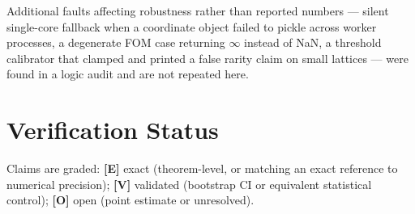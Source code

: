 \documentclass[11pt,a4paper]{article}
\begin{document}
Additional faults affecting robustness rather than reported numbers --- silent single-core
fallback when a coordinate object failed to pickle across worker processes, a degenerate FOM case
returning $\infty$ instead of NaN, a threshold calibrator that clamped and printed a false rarity
claim on small lattices --- were found in a logic audit and are not repeated here.

\section{Verification Status}\label{sec:status}

Claims are graded: \textbf{[E]} exact (theorem-level, or matching an exact reference to numerical
precision); \textbf{[V]} validated (bootstrap CI or equivalent statistical control);
\textbf{[O]} open (point estimate or unresolved).
\end{document}
